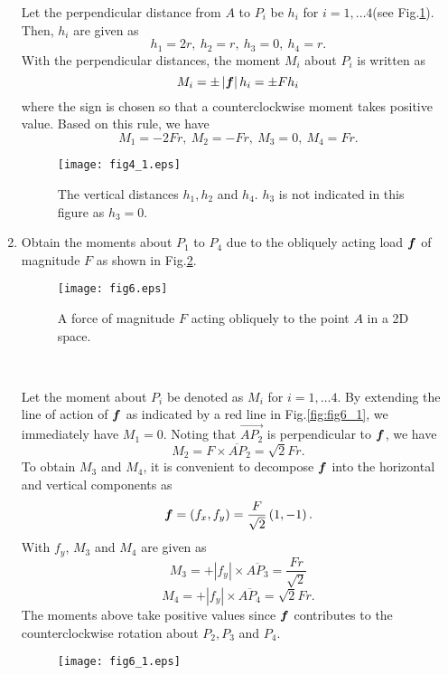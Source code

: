 \documentclass[10pt,a4j]{article}
\begin{document}
\begin{enumerate}
	{\small
		Let the perpendicular distance from $A$ to $P_i$ be $h_i$ for $i=1,\dots 4$(see Fig.\ref{fig:fig4_1}). 
		Then, $h_i$ are given as 
		\[
			h_1=2r, \ h_2=r, \ h_3=0, \ h_4=r.
		\]
		With the perpendicular distances, the moment $M_i$ about $P_i$ is written as 
		\[
			M_i=\pm \left| \mbox{\boldmath $f$} \right| h_i= \pm Fh_i
		\]	
		where the sign is chosen so that a counterclockwise moment takes positive value.
		Based on this rule, we have 
		\[
			M_1=-2Fr, \ M_2=-Fr, \ M_3=0, \ M_4=Fr.
		\]
		\begin{figure}[h]
		\begin{center}
		\texttt{[image: fig4\_1.eps]} 
		\end{center}
			\caption{The vertical distances $h_1,h_2$ and $h_4$. $h_3$ is not 
			indicated in this figure as $h_3=0$.}
		\label{fig:fig4_1}
		\end{figure}
	}
\item
	Obtain the moments about $P_1$ to $P_4$ due to the obliquely acting load $\mbox{\boldmath $f$}$ 
	of magnitude $F$ as shown in Fig.\ref{fig:fig6}.
	\begin{figure}[h]
		\begin{center}
		\texttt{[image: fig6.eps]} 
		\end{center}
		\caption{A force of magnitude $F$ acting obliquely to the point $A$ in a 2D space.} 
		\label{fig:fig6}
	\end{figure}
	\\
	{\small
		Let the moment about $P_i$ be denoted as $M_i$ for $i=1,\dots 4$.
		By extending the line of action of $\mbox{\boldmath $f$}$ as indicated by 
		a red line in Fig.\ref{fig:fig6_1}, we immediately have $M_1=0$.
		Noting that $\overrightarrow{AP_2}$ is perpendicular to $\mbox{\boldmath $f$}$, 
		we have 
		\[ 
			M_2=F\times \overline{AP}_2=\sqrt{2}Fr.
		\]
		To obtain $M_3$ and $M_4$, it is convenient to decompose $\mbox{\boldmath $f$}$ into 
		the horizontal and vertical components as 
		\[
			\mbox{\boldmath $f$}=(f_x,f_y)=\frac{F}{\sqrt{2}}\left(1, -1\right).
		\]
		With $f_y$, $M_3$ and $M_4$ are given as 
		\[
			M_3=+\left|f_y\right| \times \overline{A P_3}=\frac{Fr}{\sqrt{2}}
		\]
		\[
			M_4=+\left|f_y \right| \times \overline{A P_4}=\sqrt{2}Fr.
		\]
		The moments above take positive values since $\mbox{\boldmath $f$}$ contributes 
		to the counterclockwise rotation about $P_2, P_3$ and $P_4$.
		\begin{figure}[h]
		\begin{center}
		\texttt{[image: fig6\_1.eps]} 
		\end{center}

\end{figure}}
\end{enumerate}
\end{document}
